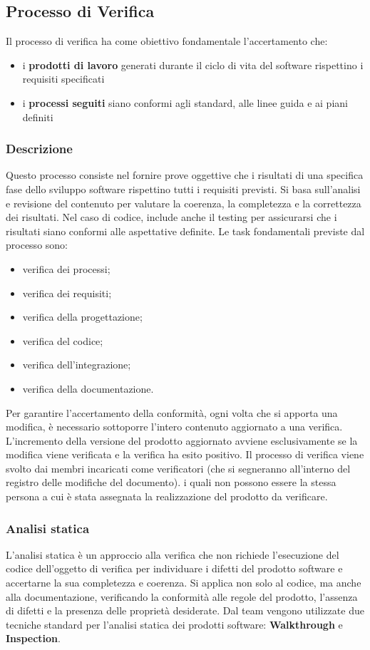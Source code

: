 \subsection{Processo di Verifica}
\label{subsec:proc_verifica}
Il processo di verifica ha come obiettivo fondamentale l'accertamento che:
\begin{itemize}
    \item i \textbf{prodotti di lavoro} generati durante il ciclo di vita del software rispettino i requisiti specificati
    \item i \textbf{processi seguiti} siano conformi agli standard, alle linee guida e ai piani definiti
\end{itemize}
\subsubsection{Descrizione}
Questo processo consiste nel fornire prove oggettive che i risultati di una specifica fase dello sviluppo software rispettino tutti i requisiti previsti. 
Si basa sull’analisi e revisione del contenuto per valutare la coerenza, la completezza e la correttezza dei risultati. Nel caso di codice, include anche il testing per assicurarsi che i risultati siano conformi alle aspettative definite.
Le task fondamentali previste dal processo sono:
\begin{itemize}
    \item verifica dei processi;
    \item verifica dei requisiti;
    \item verifica della progettazione;
    \item verifica del codice;
    \item verifica dell'integrazione;
    \item verifica della documentazione.
\end{itemize}
Per garantire l'accertamento della conformità, ogni volta che si apporta una modifica, è necessario sottoporre l'intero contenuto aggiornato a una verifica. 
L'incremento della versione del prodotto aggiornato avviene esclusivamente se la modifica viene verificata e la verifica ha esito positivo.
Il processo di verifica viene svolto dai membri incaricati come verificatori (che si segneranno all'interno del registro delle modifiche del documento). 
i quali non possono essere la stessa persona a cui è stata assegnata la realizzazione del prodotto da verificare.
\subsubsection{Analisi statica}
L'analisi statica è un approccio alla verifica che non richiede l'esecuzione del codice dell'oggetto di verifica per individuare i difetti del prodotto software 
e accertarne la sua completezza e coerenza.
Si applica non solo al codice, ma anche alla documentazione, verificando la conformità alle regole del prodotto, l'assenza di difetti e la presenza delle proprietà desiderate.
Dal team vengono utilizzate due tecniche standard per l'analisi statica dei prodotti software: \textbf{Walkthrough} e \textbf{Inspection}.

